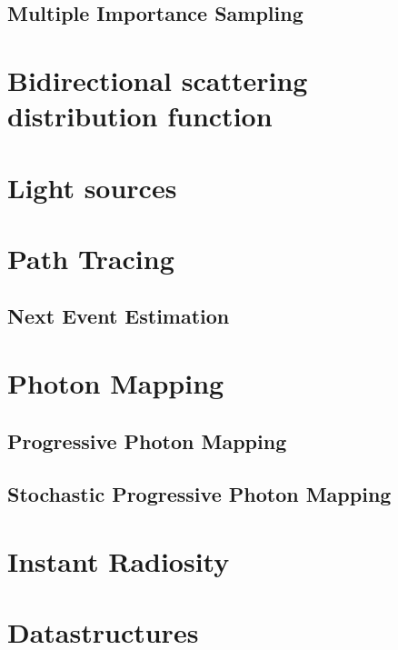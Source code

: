 \subsection{Multiple Importance Sampling}

\section{Bidirectional scattering distribution function}


\section{Light sources}


\section{Path Tracing}
\subsection{Next Event Estimation}



\section{Photon Mapping}

\subsection{Progressive Photon Mapping}

\subsection{Stochastic Progressive Photon Mapping}



\section{Instant Radiosity}

\section{Datastructures}


